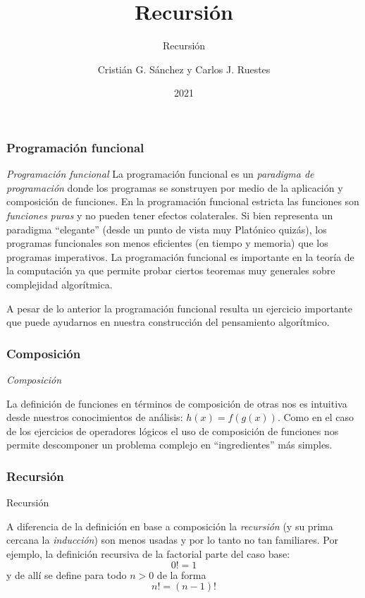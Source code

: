 \documentclass{beamer}
\title{Recursión}
\subtitle{Recursión}
\author{Cristián G. Sánchez y Carlos J. Ruestes}
\date{2021}
\begin{document}
\frame{\titlepage}

\begin{frame}[fragile]
    \frametitle{Programación funcional}
    \begin{block}{{\em Programación funcional}}
        La programación funcional es un {\em paradigma de programación} donde los programas se sonstruyen por medio de la
        aplicación y composición de funciones. En la programación funcional estricta las funciones son {\em funciones puras} 
        y no pueden tener efectos colaterales. Si bien representa un paradigma ``elegante'' (desde un punto de vista muy Platónico quizás),
        los programas funcionales son menos eficientes (en tiempo y memoria) que los programas imperativos. La programación funcional es importante
        en la teoría de la computación ya que permite probar ciertos teoremas muy generales sobre complejidad algorítmica.
    \end{block}    
    A pesar de lo anterior la programación funcional resulta un ejercicio importante que puede ayudarnos en nuestra construcción del pensamiento algorítmico.
\end{frame}

\begin{frame}[fragile]
    \frametitle{Composición}
    \begin{block}{{\em Composición}}

    La definición de funciones en términos de composición de otras nos es intuitiva desde nuestros conocimientos de análisis: $h(x) =f(g(x))$.
    Como en el caso de los ejercicios de operadores lógicos el uso de composición de funciones nos permite descomponer un problema complejo
    en ``ingredientes'' más simples.
    \end{block}
\end{frame}

\begin{frame}[fragile]
    \frametitle{Recursión}
    \begin{block}{Recursión}

    A diferencia de la definición en base a composición la {\em recursión} (y su prima cercana la {\em inducción}) son menos usadas y por lo tanto
    no tan familiares. Por ejemplo, la definición recursiva de la factorial parte del \alert{caso base}:
    $$0!=1$$
    y de allí se define para todo $n>0$ de la forma
    $$n! = (n-1)!$$
\end{block}
\end{frame}
\end{document}
